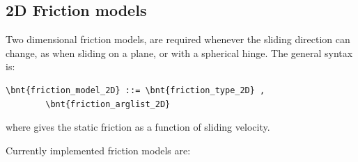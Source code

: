 \subsection{2D Friction models}
\label{sec:friction model 2D}
Two dimensional friction models,  are required whenever the sliding direction can change, as when sliding on a plane, or with a spherical hinge. The general syntax is:
\begin{Verbatim}[commandchars=\\\{\}]
    \bnt{friction_model_2D} ::= \bnt{friction_type_2D} ,
        \bnt{friction_arglist_2D}
\end{Verbatim}
where  gives the static friction
as a function of sliding velocity.

Currently implemented friction models are:
